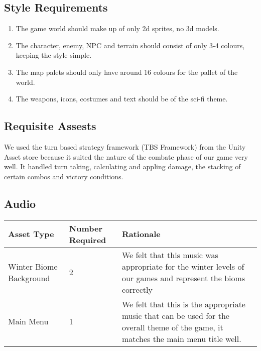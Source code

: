 \documentclass{article}
\begin{document}
\subsection{Style Requirements}
\begin{enumerate}[{SR}1. ]
	\item The game world should make up of only 2d sprites, no 3d models.
	\item The character, enemy, NPC and terrain should consist of only 3-4 colours, keeping the style simple.
	\item The map palets should only have around 16 colours for the pallet of the world.
	\item The weapons, icons, costumes and text should be of the sci-fi theme.
\end{enumerate}
\subsection{Requisite Assests}
\quad We used the turn based strategy framework (TBS Framework) from the Unity Asset store because it suited the nature of the combate phase of our game very well. It handled turn taking, calculating and appling damage, the stacking of certain combos and victory conditions.
\subsection{Audio}
\begin{center}
\begin{tabular}{ | m{5cm} | m{5cm}|m{5cm}|} 
\hline
Asset Type & Number Required & Rationale\\ 
\hline
Winter Biome Background & 2 & We felt that this music was appropriate for the winter levels of our games and represent the bioms correctly\\
\hline
Main Menu & 1 & We felt that this is the appropriate music that can be used for the overall theme of the game, it matches the main menu title well.\\
\hline
\end{tabular}
\end{center}
\end{document}
